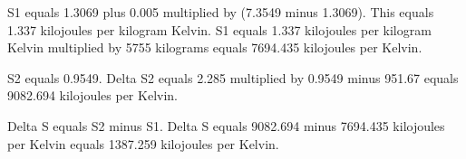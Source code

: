 S1 equals 1.3069 plus 0.005 multiplied by (7.3549 minus 1.3069).  
This equals 1.337 kilojoules per kilogram Kelvin.  
S1 equals 1.337 kilojoules per kilogram Kelvin multiplied by 5755 kilograms equals 7694.435 kilojoules per Kelvin.  

S2 equals 0.9549.  
Delta S2 equals 2.285 multiplied by 0.9549 minus 951.67 equals 9082.694 kilojoules per Kelvin.  

Delta S equals S2 minus S1.  
Delta S equals 9082.694 minus 7694.435 kilojoules per Kelvin equals 1387.259 kilojoules per Kelvin.